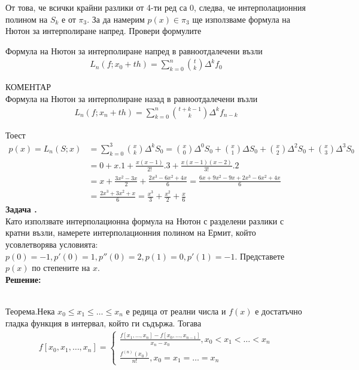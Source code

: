 \documentclass[12pt]{article}
\newcounter{problem}
\newcounter{solution}
\newcommand\problem{%
  \stepcounter{problem}%
  \textbf{Задача \theproblem.}~%
  \\
}
\newcommand\solution{%
  \textbf{Решение:}\\~%
}
\begin{document}
От това, че всички крайни разлики от 4-ти ред са 0, следва, че интерполационния полином на $S_k$ е от $\pi_3$.
За да намерим $p(x)\in\pi_3$ ще използваме формула на Нютон за интерполиране напред.
Провери формулите
\begin{tcolorbox}[colback=red!5!white,colframe=red!75!black]
Формула на Нютон за интерполиране напред в равноотдалечени възли
\begin{align*}
L_n(f;x_0+th)=\sum_{k=0}^{n}{t \choose k}\Delta^kf_0
\end{align*}
\end{tcolorbox}
\begin{tcolorbox}[colback=red!5!white,colframe=red!75!black]
КОМЕНТАР\\
Формула на Нютон за интерполиране назад в равноотдалечени възли
\begin{align*}
L_n(f;x_n+th)=\sum_{k=0}^{n}{t+k-1 \choose k}\Delta^kf_{n-k}
\end{align*}
\end{tcolorbox}
Тоест 
\begin{align*}
p(x)=L_n(S;x)&=\sum_{k=0}^{3}{x \choose k}\Delta^kS_0 =
 {x \choose 0}\Delta^0S_0+{x \choose 1}\Delta S_0+{x \choose 2}\Delta^2S_0+{x \choose 3}\Delta^3S_0 \\
&=0+x.1+\frac{x(x-1)}{2!}.3+\frac{x(x-1)(x-2)}{3!}.2 \\
&= x+\frac{3x^2-3x}{2}+\frac{2x^3-6x^2+4x}{6}=\frac{6x+9x^2-9x+2x^3-6x^2+4x}{6}\\&=\frac{2x^3+3x^2+x}{6} =\boxed{\frac{x^3}{3}+\frac{x^2}{2} +\frac{x}{6}}
\end{align*}
\problem
Като използвате интерполационна формула на Нютон с разделени разлики с кратни възли, намерете интерполационния полином на Ермит, който усовлетворява условията: $p(0) = -1, p'(0) = 1, p''(0)=2, p(1) =0,p'(1)=-1$. Представете $p(x)$ по степените на $x$.\\
\solution
\begin{tcolorbox}[colback=red!5!white,colframe=red!75!black]
Теорема.Нека $x_0\leq x_1\leq\ldots\leq x_n$ е редица от реални числа и $f(x)$ е достатъчно гладка функция в интервал, който ги съдържа. Тогава
\begin{align*}
f[x_0,x_1,\ldots,x_n] = \begin{cases}
                            \frac{f[x_1,\ldots,x_n]-f[x_0,\ldots,x_{n-1}]}{x_n-x_0},x_0<x_1<\ldots<x_n\\
                            \frac{f^{(n)}(x_0)}{n!} , x_0=x_1=\ldots=x_n
                        \end{cases}
\end{align*}
\end{tcolorbox}
\end{document}
